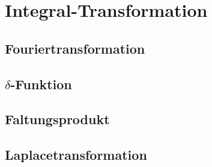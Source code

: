 \section{Integral-Transformation}
\subsection[Fouriertransformation]{Fouriertransformation }

\subsection[$\delta$-Funktion]{$\delta$-Funktion }

\subsection[Faltungsprodukt]{Faltungsprodukt }

\subsection[Laplacetransformation]{Laplacetransformation }


